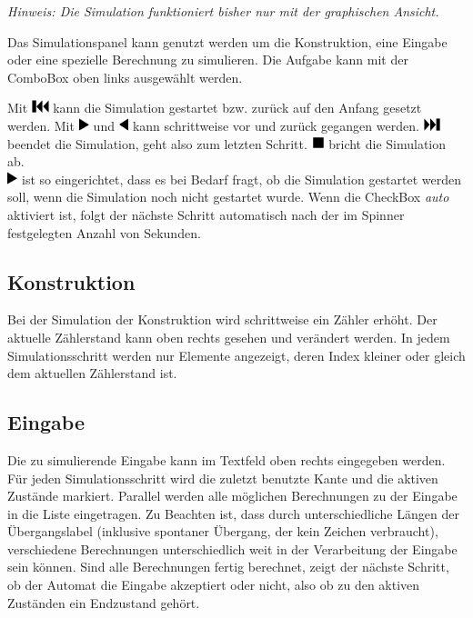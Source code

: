\textit{Hinweis: Die Simulation funktioniert bisher nur mit der graphischen Ansicht.}

Das Simulationspanel kann genutzt werden um die Konstruktion, eine Eingabe oder eine spezielle Berechnung zu simulieren. Die Aufgabe kann mit der ComboBox oben links ausgewählt werden.

Mit \includegraphics[height=1em]{pic/icons/beginning} kann die Simulation gestartet bzw. zurück auf den Anfang gesetzt werden. Mit \includegraphics[height=1em]{pic/icons/next} und \includegraphics[height=1em]{pic/icons/last} kann schrittweise vor und zurück gegangen werden. \includegraphics[height=1em]{pic/icons/end} beendet die Simulation, geht also zum letzten Schritt. \includegraphics[height=1em]{pic/icons/stop} bricht die Simulation ab.\\
\includegraphics[height=1em]{pic/icons/next} ist so eingerichtet, dass es bei Bedarf fragt, ob die Simulation gestartet werden soll, wenn die Simulation noch nicht gestartet wurde. Wenn die CheckBox \textit{auto} aktiviert ist, folgt der nächste Schritt automatisch nach der im Spinner festgelegten Anzahl von Sekunden.
\subsection{Konstruktion}
Bei der Simulation der Konstruktion wird schrittweise ein Zähler erhöht. Der aktuelle Zählerstand kann oben rechts gesehen und verändert werden. In jedem Simulationsschritt werden nur Elemente angezeigt, deren Index kleiner oder gleich dem aktuellen Zählerstand ist.
\subsection{Eingabe}
Die zu simulierende Eingabe kann im Textfeld oben rechts eingegeben werden. Für jeden Simulationsschritt wird die zuletzt benutzte Kante und die aktiven Zustände markiert. Parallel werden alle möglichen Berechnungen zu der Eingabe in die Liste eingetragen. Zu Beachten ist, dass durch unterschiedliche Längen der Übergangslabel (inklusive spontaner Übergang, der kein Zeichen verbraucht), verschiedene Berechnungen unterschiedlich weit in der Verarbeitung der Eingabe sein können. Sind alle Berechnungen fertig berechnet, zeigt der nächste Schritt, ob der Automat die Eingabe akzeptiert oder nicht, also ob zu den aktiven Zuständen ein Endzustand gehört.
